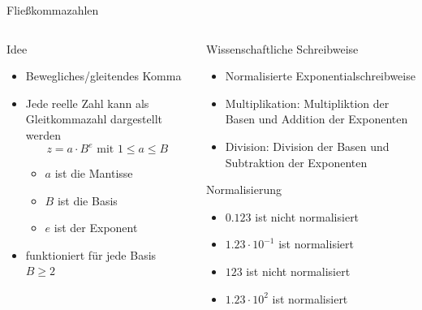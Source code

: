 \documentclass[xelatex,aspectratio=169]{beamer}
\begin{document}
\begin{frame}{Fließkommazahlen}
  \begin{columns}[T]
    \begin{column}{0.5\textwidth}
      \begin{block}{Idee}
        \begin{itemize}
          \item Bewegliches/gleitendes Komma
          \item Jede reelle Zahl kann als Gleitkommazahl dargestellt werden
                \[ z = a \cdot B ^ e \mbox{ mit } 1 \leq a \leq B \]
                \begin{itemize}
                  \item \(a\) ist die Mantisse
                  \item \(B\) ist die Basis
                  \item \(e\) ist der Exponent
                \end{itemize}
          \item funktioniert für jede Basis \(B\geq 2\)
        \end{itemize}
      \end{block}
    \end{column}
    \begin{column}{0.5\textwidth}
      \begin{block}{Wissenschaftliche Schreibweise}
        \begin{itemize}
          \item Normalisierte Exponentialschreibweise
          \item Multiplikation: Multipliktion der Basen und Addition der Exponenten
          \item Division: Division der Basen und Subtraktion der Exponenten
        \end{itemize}
      \end{block}
      \begin{exampleblock}{Normalisierung}
        \begin{itemize}
          \item \(0.123\) ist nicht normalisiert
          \item \(1.23 \cdot 10^{-1}\) ist normalisiert
          \item \(123 \) ist nicht normalisiert
          \item \(1.23 \cdot 10^2\) ist normalisiert
        \end{itemize}

      \end{exampleblock}
    \end{column}
  \end{columns}

\end{frame}
\end{document}
